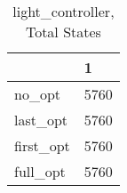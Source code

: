 \begin{table}
\caption{light\_controller, Total States}
\label{light_controller_total}
\begin{tabular}{ll}
\toprule
 & 1 \\
\midrule
no\_opt & 5760 \\
last\_opt & 5760 \\
first\_opt & 5760 \\
full\_opt & 5760 \\
\bottomrule
\end{tabular}
\end{table}
